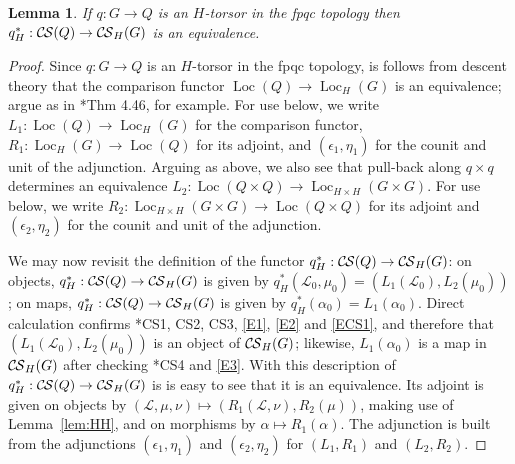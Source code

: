 \documentclass[10pt]{amsart}
\theoremstyle{plain}
\newtheorem{lemma}[theorem]{Lemma}
\theoremstyle{definition}
\newcommand{\Fq}{k}
\DeclareMathOperator{\Loc}{Loc}
\newcommand{\cs}[1]{{\mathcal{#1}}}
\newcommand{\CS}{{\mathcal{C\hskip-0.8pt S}}}
\begin{document}
\begin{lemma}\label{lem:torsor}
If $q : G \to Q$ is an $H$-torsor in the fpqc topology 
then $q_H^*: \CS(Q) \to \CS_H(G)$ is an equivalence.
\end{lemma}

\begin{proof}
Since $q : G\to Q$ is an $H$-torsor in the fpqc topology, is follows from descent theory that the comparison functor $\Loc(Q) \to \Loc_H(G)$ is an equivalence; argue as in \cite{Vistoli:notes}*{Thm 4.46}, for example.
%
For use below, we write $L_1 : \Loc(Q) \to \Loc_H(G)$ for the comparison functor, $R_1 : \Loc_H(G) \to \Loc(Q)$ for its adjoint, and $(\epsilon_1, \eta_1)$ for the counit and unit of the adjunction.
%
Arguing as above, we also see that pull-back along $q\times q$ determines an equivalence $L_2 : \Loc(Q\times Q) \to \Loc_{H\times H}(G\times G)$.
For use below, we write $R_2 : \Loc_{H\times H}(G\times G) \to \Loc(Q\times Q)$ for its adjoint and $(\epsilon_2, \eta_2)$ for the counit and unit of the adjunction.

We may now revisit the definition of the functor $q_H^*: \CS(Q)\to \CS_H(G)$:
on objects, $q_H^*: \CS(Q)\to \CS_H(G)$ is given by $q_H^*(\cs{L}_0,\mu_0) = (L_1(\cs{L}_0), L_2(\mu_0))$; on maps, $q_H^*: \CS(Q)\to \CS_H(G)$ is given by $q_H^*(\alpha_0) = L_1(\alpha_0)$.
Direct calculation confirms \cite{cunningham-roe:13a}*{CS1, CS2, CS3}, \eqref{E1}, \eqref{E2} and \eqref{ECS1}, and therefore that $(L_1(\cs{L}_0), L_2(\mu_0))$ is an object of $\CS_H(G)$; 
likewise, $L_1(\alpha_0)$ is a map in $\CS_H(G)$ after checking \cite{cunningham-roe:13a}*{CS4} and \eqref{E3}.
%
With this description of $q_H^*: \CS(Q)\to \CS_H(G)$ is is easy to see that it is an equivalence.
Its adjoint is given on objects by $(\cs{L},\mu,\nu) \mapsto (R_1(\cs{L},\nu), R_2(\mu))$, making use of Lemma~\ref{lem:HH}, and on morphisms by $\alpha \mapsto R_1(\alpha)$.
The adjunction is built from the adjunctions $(\epsilon_1, \eta_1)$ and $(\epsilon_2, \eta_2)$ for $(L_1,R_1)$ and $(L_2, R_2)$.
\end{proof}
\end{document}
